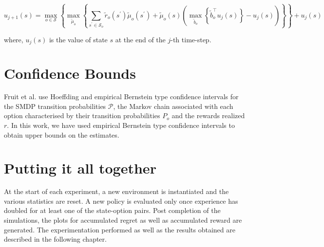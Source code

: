 \begin{equation}
    \label{eqn:fruit7}
    u_{j+1}(s) = \max_{o \in \mathcal{S}} \left\{ \max_{\tilde{\mu}_o} \left\{ \sum_{s^\prime \in \mathcal{S}_o} \tilde{r}_o(s^\prime) \tilde{\mu}_o(s^\prime) + \tilde{\mu}_o(s) \left( \max_{\tilde{b}_o}\left\{ \tilde{b}_o^\top u_j(s) \right\} - u_j(s) \right) \right\} \right\} + u_j(s)
\end{equation}

where, $u_j(s)$ is the value of state $s$ at the end of the $j$-th time-step.


\section{Confidence Bounds}

Fruit et al. \cite{fruit_regret_2017} use Hoeffding and empirical Bernstein type confidence intervals for the SMDP transition probabilities $\mathcal{P}$, the Markov chain associated with each option characterised by their transition probabilities $P_o$ and the rewards realized $r$.
In this work, we have used empirical Bernstein type confidence intervals to obtain upper bounds on the estimates.


\section{Putting it all together}

At the start of each experiment, a new environment is instantiated and the various statistics are reset.
A new policy is evaluated only once experience has doubled for at least one of the state-option pairs.
Post completion of the simulations, the plots for accumulated regret as well as accumulated reward are generated.
The experimentation performed as well as the results obtained are described in the following chapter.
